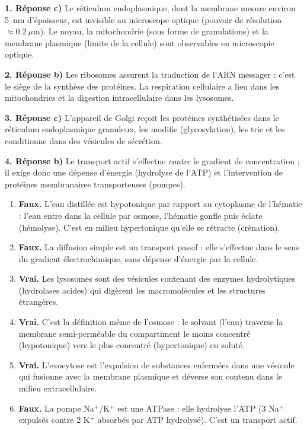 \documentclass[11pt]{article}
\newcommand{\cle}[1]{{\popxbold\color{popdark}#1}}
\begin{document}
\begin{corrige}
\textbf{1. Réponse c)} Le réticulum endoplasmique, dont la membrane mesure environ 5~nm d'épaisseur, est invisible au microscope optique (pouvoir de résolution $\approx \num{0,2}~\mu$m). Le noyau, la mitochondrie (sous forme de granulations) et la membrane plasmique (limite de la cellule) sont observables en microscopie optique.

\textbf{2. Réponse b)} Les ribosomes assurent la traduction de l'ARN messager : c'est le siège de la \cle{synthèse des protéines}. La respiration cellulaire a lieu dans les mitochondries et la digestion intracellulaire dans les lysosomes.

\textbf{3. Réponse c)} L'appareil de Golgi reçoit les protéines synthétisées dans le réticulum endoplasmique granuleux, les modifie (glycosylation), les trie et les conditionne dans des vésicules de sécrétion.

\textbf{4. Réponse b)} Le transport actif s'effectue \emph{contre} le gradient de concentration ; il exige donc une dépense d'énergie (hydrolyse de l'ATP) et l'intervention de protéines membranaires transporteuses (pompes).
\end{corrige}

\begin{corrige}
\begin{enumerate}
\item \textbf{Faux.} L'eau distillée est hypotonique par rapport au cytoplasme de l'hématie : l'eau entre dans la cellule par osmose, l'hématie gonfle puis éclate (hémolyse). C'est en milieu hypertonique qu'elle se rétracte (crénation).
\item \textbf{Faux.} La diffusion simple est un transport passif : elle s'effectue dans le sens du gradient électrochimique, sans dépense d'énergie par la cellule.
\item \textbf{Vrai.} Les lysosomes sont des vésicules contenant des enzymes hydrolytiques (hydrolases acides) qui digèrent les macromolécules et les structures étrangères.
\item \textbf{Vrai.} C'est la définition même de l'osmose : le solvant (l'eau) traverse la membrane semi-perméable du compartiment le moins concentré (hypotonique) vers le plus concentré (hypertonique) en soluté.
\item \textbf{Vrai.} L'exocytose est l'expulsion de substances enfermées dans une vésicule qui fusionne avec la membrane plasmique et déverse son contenu dans le milieu extracellulaire.
\item \textbf{Faux.} La pompe Na$^+$/K$^+$ est une ATPase : elle hydrolyse l'ATP (3 Na$^+$ expulsés contre 2 K$^+$ absorbés par ATP hydrolysé). C'est un transport actif.
\end{enumerate}
\end{corrige}
\end{document}
